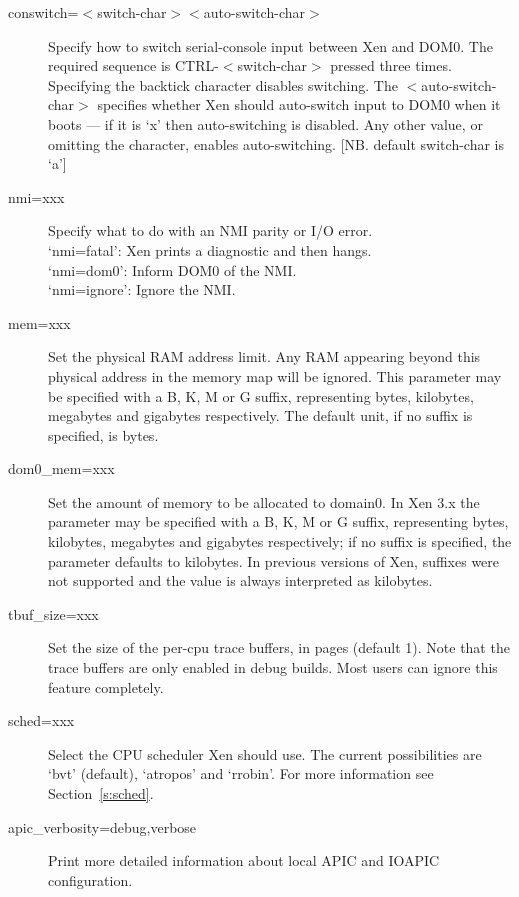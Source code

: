 \documentclass[11pt,twoside,final,openright]{report}
\begin{document}
{\begin{description}
\item [conswitch=$<$switch-char$><$auto-switch-char$>$ ] 
 Specify how to switch serial-console input between
 Xen and DOM0. The required sequence is CTRL-$<$switch-char$>$
 pressed three times. Specifying the backtick character 
 disables switching.
 The $<$auto-switch-char$>$ specifies whether Xen should
 auto-switch input to DOM0 when it boots --- if it is `x'
 then auto-switching is disabled.  Any other value, or
 omitting the character, enables auto-switching.
 [NB. default switch-char is `a'] 

\item [nmi=xxx ] 
 Specify what to do with an NMI parity or I/O error. \\
 `nmi=fatal':  Xen prints a diagnostic and then hangs. \\
 `nmi=dom0':   Inform DOM0 of the NMI. \\
 `nmi=ignore': Ignore the NMI. 

\item [mem=xxx ]
 Set the physical RAM address limit. Any RAM appearing beyond this
 physical address in the memory map will be ignored. This parameter
 may be specified with a B, K, M or G suffix, representing bytes,
 kilobytes, megabytes and gigabytes respectively. The
 default unit, if no suffix is specified, is bytes.

\item [dom0\_mem=xxx ] 
 Set the amount of memory to be allocated to domain0. In Xen 3.x the parameter
 may be specified with a B, K, M or G suffix, representing bytes,
 kilobytes, megabytes and gigabytes respectively; if no suffix is specified, 
 the parameter defaults to kilobytes. In previous versions of Xen, suffixes
 were not supported and the value is always interpreted as kilobytes. 

\item [tbuf\_size=xxx ] 
 Set the size of the per-cpu trace buffers, in pages
 (default 1).  Note that the trace buffers are only
 enabled in debug builds.  Most users can ignore
 this feature completely. 

\item [sched=xxx ] 
 Select the CPU scheduler Xen should use.  The current
 possibilities are `bvt' (default), `atropos' and `rrobin'. 
 For more information see Section~\ref{s:sched}. 

\item [apic\_verbosity=debug,verbose ]
 Print more detailed information about local APIC and IOAPIC configuration.


\end{description}}
\end{document}
